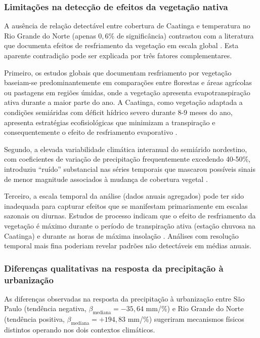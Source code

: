\subsubsection*{Limitações na detecção de efeitos da vegetação nativa}

A ausência de relação detectável entre cobertura de Caatinga e temperatura no Rio Grande do Norte (apenas $0{,}6\%$ de significância) contrastou com a literatura que documenta efeitos de resfriamento da vegetação em escala global \citep{li2015local, alkama2016biophysical}. Esta aparente contradição pode ser explicada por três fatores complementares.

Primeiro, os estudos globais que documentam resfriamento por vegetação baseiam-se predominantemente em comparações entre florestas e áreas agrícolas ou pastagens em regiões úmidas, onde a vegetação apresenta evapotranspiração ativa durante a maior parte do ano. A Caatinga, como vegetação adaptada a condições semiáridas com déficit hídrico severo durante 8-9 meses do ano, apresenta estratégias ecofisiológicas que minimizam a transpiração e consequentemente o efeito de resfriamento evaporativo \citep{santos2014caatinga}.

Segundo, a elevada variabilidade climática interanual do semiárido nordestino, com coeficientes de variação de precipitação frequentemente excedendo 40-50\%, introduziu ``ruído'' substancial nas séries temporais que mascarou possíveis sinais de menor magnitude associados à mudança de cobertura vegetal \citep{marengo2017drought}.

Terceiro, a escala temporal da análise (dados anuais agregados) pode ter sido inadequada para capturar efeitos que se manifestam primariamente em escalas sazonais ou diurnas. Estudos de processo indicam que o efeito de resfriamento da vegetação é máximo durante o período de transpiração ativa (estação chuvosa na Caatinga) e durante as horas de máxima insolação \citep{duveiller2018local}. Análises com resolução temporal mais fina poderiam revelar padrões não detectáveis em médias anuais.

\subsubsection*{Diferenças qualitativas na resposta da precipitação à urbanização}

As diferenças observadas na resposta da precipitação à urbanização entre São Paulo (tendência negativa, $\beta_{\text{mediana}} = -35{,}64$ mm/\%) e Rio Grande do Norte (tendência positiva, $\beta_{\text{mediana}} = +194{,}83$ mm/\%) sugeriram mecanismos físicos distintos operando nos dois contextos climáticos.


